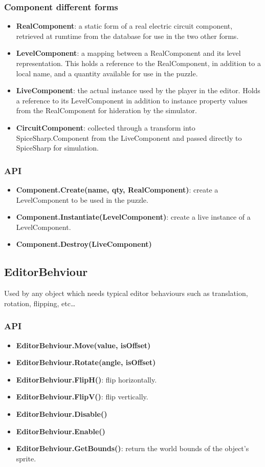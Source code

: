 \documentclass[../main.tex]{subfiles}
\begin{document}
\subsubsection{Component different forms}
\begin{itemize}
    \item \textbf{RealComponent}: a static form of a real electric circuit component, retrieved at rumtime from the database for use in the two other forms.
    \item \textbf{LevelComponent}: a mapping between a RealComponent and its level representation. This holds a reference to the RealComponent, in addition to a local name, and a quantity available for use in the puzzle.
    \item \textbf{LiveComponent}: the actual instance used by the player in the editor. Holds a reference to its LevelComponent in addition to instance property values from the RealComponent for hideration by the simulator.
    \item \textbf{CircuitComponent}: collected through a transform into SpiceSharp.Component from the LiveComponent and passed directly to SpiceSharp for simulation. 
\end{itemize}

\subsubsection*{API}
\begin{itemize}
    \item \textbf{Component.Create(name, qty, RealComponent)}: create a LevelComponent to be used in the puzzle. 
    \item \textbf{Component.Instantiate(LevelComponent)}: create a live instance of a LevelComponent. 
    \item \textbf{Component.Destroy(LiveComponent)}
\end{itemize}

\subsection{EditorBehviour}
Used by any object which needs typical editor behaviours such as translation, rotation, flipping, etc\dots
\subsubsection*{API}
\begin{itemize}
    \item \textbf{EditorBehviour.Move(value, isOffset)}
    \item \textbf{EditorBehviour.Rotate(angle, isOffset)}
    \item \textbf{EditorBehviour.FlipH()}: flip horizontally.
    \item \textbf{EditorBehviour.FlipV()}: flip vertically.
    \item \textbf{EditorBehviour.Disable()}
    \item \textbf{EditorBehviour.Enable()}
    \item \textbf{EditorBehviour.GetBounds()}: return the world bounds of the object's sprite.
\end{itemize}
\end{document}
